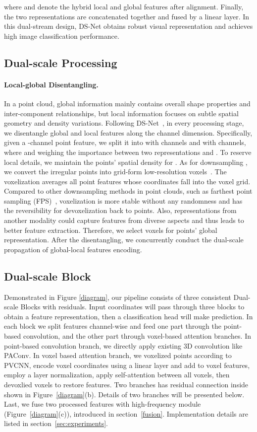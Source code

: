 \documentclass[sigconf]{acmart}
\begin{document}
where  and  denote the hybrid local and global features after alignment. Finally, the two representations are concatenated together and fused by a linear layer.  In this dual-stream design, DS-Net obtains robust visual representation and achieves high image classification performance.

\subsection{Dual-scale Processing}
\paragraph{Local-global Disentangling.}
In a point cloud, global information mainly contains overall shape properties and inter-component relationships, but local information focuses on subtle spatial geometry and density variations.  Following DS-Net~\cite{mao2021dual}, in every processing stage, we disentangle global and local features along the channel dimension. Specifically, given a -channel point feature, we split it into  with  channels and  with  channels, where  and  weighing the importance between two representations and  . To reserve local details, we maintain the points' spatial density for . As for downsampling , we convert the irregular points into grid-form low-resolution voxels~\cite{liu2019point}. The voxelization averages all point features whose coordinates fall into the voxel grid. Compared to other downsampling methods in point clouds, such as farthest point sampling (FPS)~\cite{qi2017pointnet++}, voxelization is more stable without any randomness and has the reversibility for devoxelization back to points. Also, representations from another modality could capture features from diverse aspects and thus leads to better feature extraction. Therefore, we select voxels for points' global representation. After the disentangling, we concurrently conduct the dual-scale propagation of global-local features encoding.


\subsection{Dual-scale Block}
\label{dsblock}
Demonstrated in Figure \ref{diagram}, our pipeline consists of three consistent Dual-scale Blocks with residuals. Input coordinates will pass through three blocks to obtain a feature representation, then a classification head will make prediction. In each block we split features channel-wise and feed one part through the point-based convolution, and the other part through voxel-based attention branches. In point-based convolution branch, we directly apply existing 3D convolution like PAConv\cite{xu2021paconv}. In voxel based attention branch, we voxelized points according to PVCNN\cite{liu2019point}, encode voxel coordinates using a linear layer and add to voxel features, employ a layer normalization, apply self-attention between all voxels, then devoxlied voxels to restore features.
Two branches has residual connection inside shown in Figure~\ref{diagram}(b). Details of two branches will be presented below. Last, we fuse two processed features with high-frequency module (Figure~\ref{diagram}(c)), introduced in section~\ref{fusion}. Implementation details are listed in section~\ref{sec:experiments}.
\end{document}
